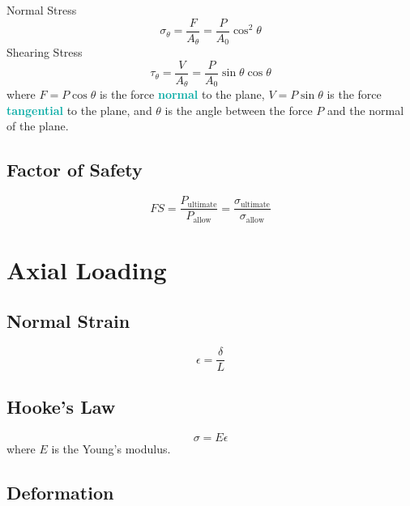 \documentclass[twoside]{article}
\newcommand{\highlightbluetext}[1]{\textcolor[HTML]{09ACA6}{\textbf{#1}}}
\begin{document}
	Normal Stress
	\begin{equation}
		\sigma_\theta = \frac{F}{A_\theta} = \frac{P}{A_0} \cos^2 \theta
		\label{eq:NormalStressOblique}
	\end{equation}
	Shearing Stress
	\begin{equation}
		\tau_\theta = \frac{V}{A_\theta} = \frac{P}{A_0} \sin \theta \cos \theta
		\label{eq:ShearingStressOblique}
	\end{equation}
	where $F = P \cos \theta$ is the force \highlightbluetext{normal} to the plane, $V = P \sin \theta$ is the force \highlightbluetext{tangential} to the plane, and $\theta$ is the angle between the force $P$ and the normal of the plane.
	
	\subsection{Factor of Safety}
	
	\begin{equation}
		FS = \frac{P_\text{ultimate}}{P_\text{allow}} = \frac{\sigma_\text{ultimate}}{\sigma_\text{allow}}
		\label{eq:FactorOfSafety}
	\end{equation}
	
	\newpage
	
	\section{Axial Loading}
	
	\subsection{Normal Strain}
	
	\begin{equation}
		\epsilon = \frac{\delta}{L}
		\label{eq:NormalStrain}
	\end{equation}
	
	\subsection{Hooke's Law}
	
	\begin{equation}
		\sigma = E \epsilon
		\label{eq:HookesLaw}
	\end{equation}
	where $E$ is the Young's modulus.
	
	\subsection{Deformation}
	
\end{document}
